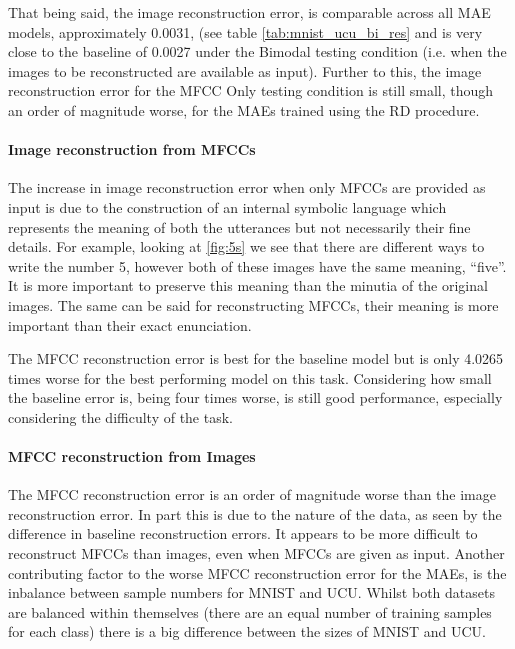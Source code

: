 That being said, the image reconstruction error, is comparable across all MAE models, approximately 0.0031, (see table \autoref{tab:mnist_ucu_bi_res} and is very close to the baseline of 0.0027 under the Bimodal testing condition (i.e. when the images to be reconstructed are available as input). Further to this, the image reconstruction error for the MFCC Only testing condition is still small, though an order of magnitude worse, for the MAEs trained using the RD procedure.

\paragraph{Image reconstruction from MFCCs}
The increase in image reconstruction error when only MFCCs are provided as input is due to the construction of an internal symbolic language which represents the meaning of both the utterances but not necessarily their fine details. For example, looking at \autoref{fig:5s} we see that there are different ways to write the number 5, however both of these images have the same meaning, ``five''. It is more important to preserve this meaning than the minutia of the original images. The same can be said for reconstructing MFCCs, their meaning is more important than their exact enunciation.  

The MFCC reconstruction error is best for the baseline model but is only 4.0265 times worse for the best performing model on this task. Considering how small the baseline error is, being four times worse, is still good performance, especially considering the difficulty of the task.

\paragraph{MFCC reconstruction from Images}
The MFCC reconstruction error is an order of magnitude worse than the image reconstruction error. In part this is due to the nature of the data, as seen by the difference in baseline reconstruction errors. It appears to be more difficult to reconstruct MFCCs than images, even when MFCCs are given as input.
Another contributing factor to the worse MFCC reconstruction error for the MAEs, is the inbalance between sample numbers for MNIST and UCU. Whilst both datasets are balanced within themselves (there are an equal number of training samples for each class) there is a big difference between the sizes of MNIST and UCU. 

